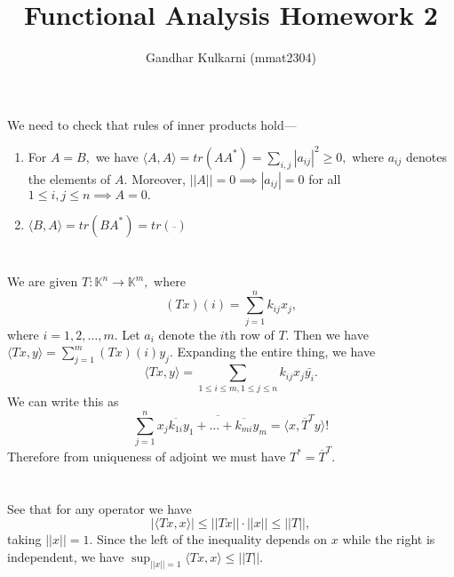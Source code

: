 \documentclass{article}
\title{Functional Analysis Homework 2} %
\author{Gandhar Kulkarni (mmat2304)} %
\date{} %
\begin{document}
\maketitle %


\section{} %
We need to check that rules of inner products hold--- 
\begin{enumerate}
	\item For $A=B,$ we have $\langle A,A\rangle=tr(AA^*)= \sum_{i,j}|a_{ij}|^2 \geq 0,$ where $a_{ij}$ denotes the elements of $A.$ 
	Moreover, $||A|| =0 \implies |a_{ij}| =0 $ for all $1 \leq i,j \leq n \implies A=0.$ 
	\item $\langle B,A \rangle = tr(BA^*)= tr(\overline{})$
\end{enumerate}
\section{} %
\section{} %
\section{} %
\section{} %
\section{} %
\section{} %
\section{} %
\section{} %
We are given $T: \mathbb{K}^n \to \mathbb{K}^m,$ where $$(Tx)(i)=\sum_{j=1}^{n}k_{ij}x_j,$$
where $i=1,2,\dots,m.$ Let $a_i$ denote the $i$th row of $T.$ Then we have $\langle Tx,y \rangle= \sum_{j=1}^m (Tx)(i)y_j.$
Expanding the entire thing, we have $$ \langle Tx,y\rangle= \sum_{1 \leq i \leq m, 1 \leq j \leq n} k_{ij}x_j \bar{y_i}.$$ We can write this as 
$$\sum_{j=1}^n x_j \overline{\overline{k_{1i}}y_1 + \dots + \overline{k_{mi}}y_m} = \langle x, \overline{T}^{T}y \rangle!$$ Therefore from uniqueness of 
adjoint we must have $T^{*}= \overline{T}^{T}.$
\section{} %
See that for any operator we have $$|\langle Tx,x\rangle| \leq ||Tx|| \cdot ||x|| \leq ||T||,$$
taking $||x|| =1.$ Since the left of the inequality depends on $x$ while the right is independent, we have $\sup_{||x||=1}\langle Tx,x\rangle \leq ||T||.$
\end{document}
